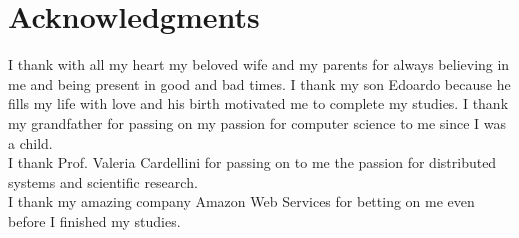 \section*{Acknowledgments}
\label{sec:acknowledgments}

I thank with all my heart my beloved wife and my parents for always believing in me and being present in good and bad times.
I thank my son Edoardo because he fills my life with love and his birth motivated me to complete my studies.
I thank my grandfather for passing on my passion for computer science to me since I was a child.\\
I thank Prof. Valeria Cardellini for passing on to me the passion for distributed systems and scientific research.\\
I thank my amazing company Amazon Web Services for betting on me even before I finished my studies.